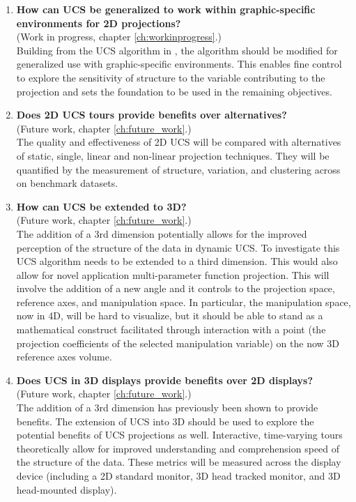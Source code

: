 \documentclass{monashthesis}
\begin{document}
\begin{enumerate}
\def\labelenumi{\arabic{enumi}.}
\item
  \textbf{How can UCS be generalized to work within graphic-specific environments for 2D projections?}\\
  (Work in progress, chapter \ref{ch:workinprogress}.)\\
  Building from the UCS algorithm in \textcite{cook_manual_1997}, the algorithm should be modified for generalized use with graphic-specific environments. This enables fine control to explore the sensitivity of structure to the variable contributing to the projection and sets the foundation to be used in the remaining objectives.
\item
  \textbf{Does 2D UCS tours provide benefits over alternatives?}\\
  (Future work, chapter \ref{ch:future_work}.)\\
  The quality and effectiveness of 2D UCS will be compared with alternatives of static, single, linear and non-linear projection techniques. They will be quantified by the measurement of structure, variation, and clustering across on benchmark datasets.
\item
  \textbf{How can UCS be extended to 3D?}\\
  (Future work, chapter \ref{ch:future_work}.)\\
  The addition of a 3rd dimension potentially allows for the improved perception of the structure of the data in dynamic UCS. To investigate this UCS algorithm needs to be extended to a third dimension. This would also allow for novel application multi-parameter function projection. This will involve the addition of a new angle and it controls to the projection space, reference axes, and manipulation space. In particular, the manipulation space, now in 4D, will be hard to visualize, but it should be able to stand as a mathematical construct facilitated through interaction with a point (the projection coefficients of the selected manipulation variable) on the now 3D reference axes volume.
\item
  \textbf{Does UCS in 3D displays provide benefits over 2D displays?}\\
  (Future work, chapter \ref{ch:future_work}.)\\
  The addition of a 3rd dimension has previously been shown to provide benefits. The extension of UCS into 3D should be used to explore the potential benefits of UCS projections as well. Interactive, time-varying tours theoretically allow for improved understanding and comprehension speed of the structure of the data. These metrics will be measured across the display device (including a 2D standard monitor, 3D head tracked monitor, and 3D head-mounted display).
\end{enumerate}
\end{document}
